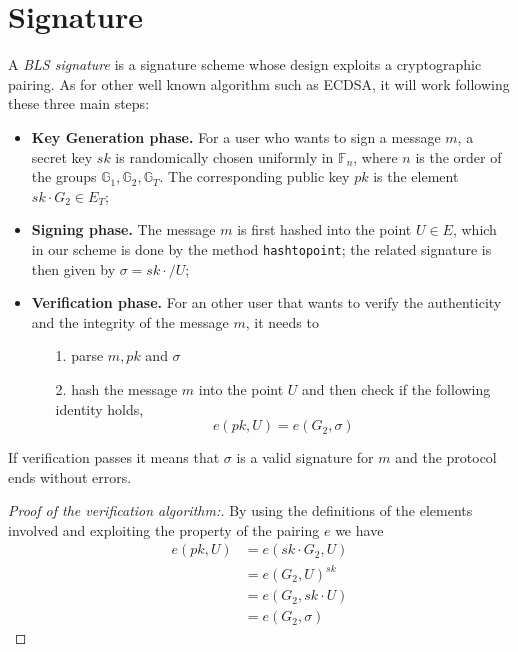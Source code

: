 \documentclass[twocolumn]{article}
\begin{document}
\section{Signature}
\label{sec:signature}

A \emph{BLS signature} is a signature scheme whose design exploits a cryptographic pairing. As for other well known algorithm such as ECDSA, it will work following these three main steps:
\begin{itemize}
    \item  \textbf{Key Generation phase.} For a user who wants to sign a message $m$, a secret key $sk$ is randomically chosen uniformly in $\mathbb{F}_n$, where $n$ is the order of the groups $\mathbb{G}_1, \mathbb{G}_2, \mathbb{G}_T$. The corresponding public key $pk$ is the element $sk\cdot G_2\in E_T$;
    \item   \textbf{Signing phase.} The message $m$ is first hashed into the point $U\in E$, which in our scheme is done by the method \verb!hashtopoint!; the related signature is then given by $\sigma = sk\cdot /U$;
    \item   \textbf{Verification phase.} For an other user that wants to verify the authenticity and the integrity of the message $m$, it needs to
    \begin{itemize}
        \item [1.] parse $m, pk$ and $\sigma$
        \item [2.] hash the message $m$ into the point $U$ and then check if the following identity holds,
        \[
        e(pk,U) = e(G_2,\sigma)
        \]
    \end{itemize}
\end{itemize}
If verification passes it means that $\sigma$ is a valid signature for $m$ and the protocol ends without errors.
\begin{proof}
 [Proof of the verification algorithm:] By using the definitions of the elements involved and exploiting the property of the pairing $e$ we have
\[
\begin{split}
    e(pk,U) &= e(sk\cdot G_2, U) \\
            &= e(G_2,U)^{sk}\\
            &= e(G_2,sk\cdot U)\\
            &= e(G_2,\sigma)
\end{split}
\]
\end{proof}
\end{document}
